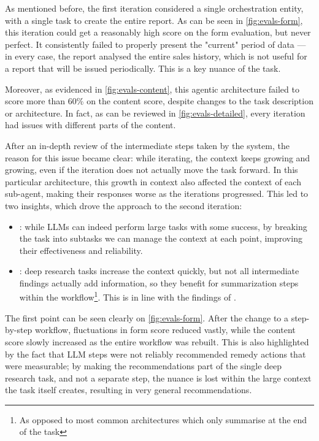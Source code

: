 \documentclass[a4paper]{report}
\begin{document}
As mentioned before, the first iteration considered a single orchestration entity, with a single task to create the entire report. As can be seen in \autoref{fig:evals-form}, this iteration could get a reasonably high score on the form evaluation, but never perfect. It consistently failed to properly present the "current" period of data --- in every case, the report analysed the entire sales history, which is not useful for a report that will be issued periodically. This is a key nuance of the task.

Moreover, as evidenced in \autoref{fig:evals-content}, this agentic architecture failed to score more than 60\% on the content score, despite changes to the task description or architecture. In fact, as can be reviewed in \autoref{fig:evals-detailed}, every iteration had issues with different parts of the content.

After an in-depth review of the intermediate steps taken by the system, the reason for this issue became clear: while iterating, the context keeps growing and growing, even if the iteration does not actually move the task forward. In this particular architecture, this growth in context also affected the context of each sub-agent, making their responses worse as the iterations progressed. This led to two insights, which drove the approach to the second iteration:

\begin{itemize}
    \item {}\kfid : while LLMs can indeed perform large tasks with some success, by breaking the task into subtasks we can manage the context at each point, improving their effectiveness and reliability.
    \item {}\kfid : deep research tasks increase the context quickly, but not all intermediate findings actually add information, so they benefit for summarization steps within the workflow\footnote{As opposed to most common architectures which only summarise at the end of the task}. This is in line with the findings of \cite{veseli2025positionalbiasesshiftinputs}.
\end{itemize}

The first point can be seen clearly on \autoref{fig:evals-form}. After the change to a step-by-step workflow, fluctuations in form score reduced vastly, while the content score slowly increased as the entire workflow was rebuilt. This is also highlighted by the fact that LLM steps were not reliably recommended remedy actions that were measurable; by making the recommendations part of the single deep research task, and not a separate step, the nuance is lost within the large context the task itself creates, resulting in very general recommendations.
\end{document}

